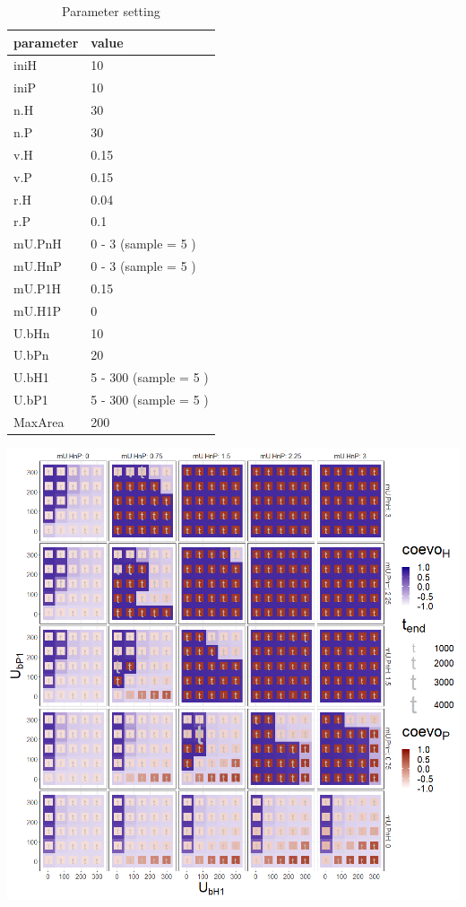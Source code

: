\documentclass[
]{book}
\begin{document}
\begin{table}[!h]

\caption{\label{tab:4Ub1mUntablepdf}Parameter setting}
\centering
\begin{tabular}[t]{l|l}
\hline
parameter & value\\
\hline
iniH & 10\\
\hline
iniP & 10\\
\hline
n.H & 30\\
\hline
n.P & 30\\
\hline
v.H & 0.15\\
\hline
v.P & 0.15\\
\hline
r.H & 0.04\\
\hline
r.P & 0.1\\
\hline
mU.PnH & 0 - 3 (sample = 5 )\\
\hline
mU.HnP & 0 - 3 (sample = 5 )\\
\hline
mU.P1H & 0.15\\
\hline
mU.H1P & 0\\
\hline
U.bHn & 10\\
\hline
U.bPn & 20\\
\hline
U.bH1 & 5 - 300 (sample = 5 )\\
\hline
U.bP1 & 5 - 300 (sample = 5 )\\
\hline
MaxArea & 200\\
\hline
\end{tabular}
\end{table}

\newpage

\includegraphics[width=1\linewidth]{plots/4_fourPar-U.b1-mUn_plot}
\end{document}
